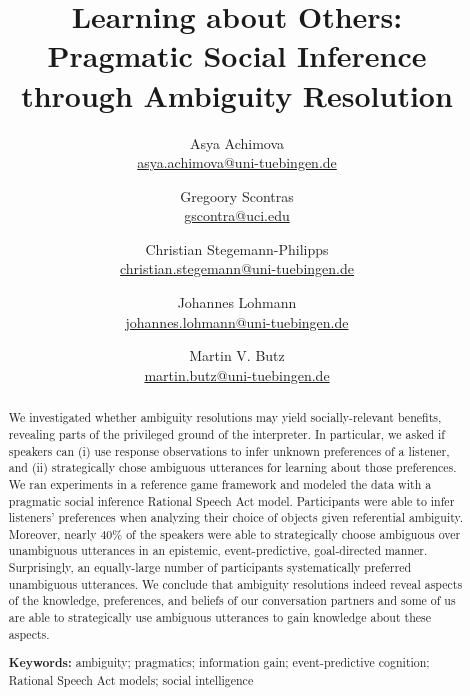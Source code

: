 \documentclass[10pt,a4paper]{article}
\title{Learning about Others:\\
	Pragmatic Social Inference \\ through Ambiguity Resolution
}
\author{
		Asya Achimova\\
		\href{mailto:asya.achimova@uni-tuebingen.de}{asya.achimova@uni-tuebingen.de}
	\and
		Gregoory Scontras\\
		\href{mailto:gscontra@uci.edu}{gscontra@uci.edu}
	\and 
		Christian Stegemann-Philipps\\
		\href{mailto:christian.stegemann@uni-tuebingen.de}{christian.stegemann@uni-tuebingen.de}
	\and
		Johannes Lohmann\\
		\href{mailto:johannes.lohmann@uni-tuebingen.de}{johannes.lohmann@uni-tuebingen.de}
	\and
		Martin V. Butz \\
		\href{mailto:martin.butz@uni-tuebingen.de}{martin.butz@uni-tuebingen.de}
}
\begin{document}
\maketitle

\begin{abstract}
We investigated whether ambiguity resolutions may yield socially-relevant benefits,
revealing parts of the privileged ground of the interpreter. 
In particular, we asked if speakers can (i) use response observations to infer unknown preferences of a listener, and (ii) strategically chose ambiguous utterances for learning about those preferences. 
We ran experiments in a reference game framework and modeled the data with a pragmatic social inference Rational Speech Act model.
Participants were able to infer listeners' preferences when analyzing their choice of objects given referential ambiguity.
Moreover, nearly 40\% of the speakers were able to strategically choose ambiguous over unambiguous utterances in an epistemic, event-predictive, goal-directed manner.
Surprisingly, an equally-large number of participants systematically preferred unambiguous utterances. 
We conclude that ambiguity resolutions indeed reveal aspects of the knowledge, preferences, and beliefs of our conversation partners and some of us are able to strategically use ambiguous utterances to gain knowledge about these aspects.

\textbf{Keywords:} 
ambiguity; pragmatics; information gain; event-predictive cognition; Rational Speech Act models; social intelligence
\end{abstract}
\end{document}
